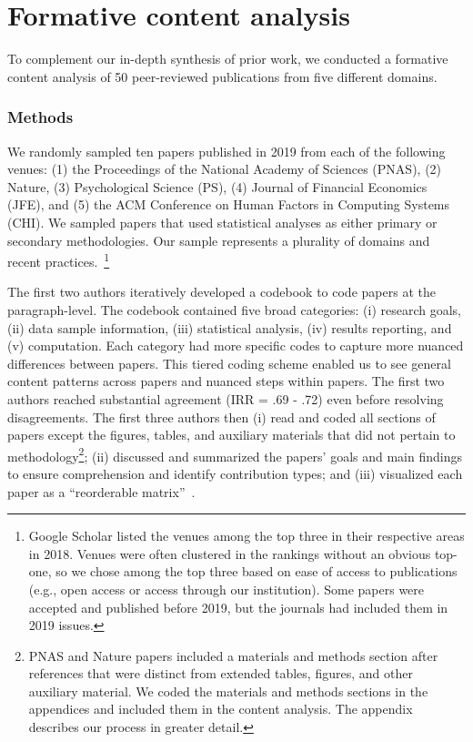 \section{Formative content analysis} \label{sec:contentAnalysisHypoForm} 
To complement our in-depth synthesis of prior work, we conducted a formative
content analysis of 50 peer-reviewed publications from five different domains. 

\subsubsection{Methods}
We randomly sampled ten papers published in 2019 from each of the following
venues: (1) the Proceedings of the National Academy of Sciences (PNAS), (2)
Nature, (3) Psychological Science (PS), (4) Journal of Financial Economics
(JFE), and (5) the ACM Conference on Human Factors in Computing Systems (CHI).
We sampled papers that used statistical analyses as either primary or secondary
methodologies. Our sample represents a plurality of domains and recent
practices.~\footnote{Google Scholar listed the venues among the top three in
their respective areas in 2018. Venues were often clustered in the rankings
without an obvious top-one, so we chose among the top three based on ease of
access to publications (e.g., open access or access through our institution).
Some papers were accepted and published before 2019, but the journals had
included them in 2019 issues.}


The first two authors iteratively developed a codebook to code papers at the
paragraph-level. The codebook contained five broad categories: (i) research
goals, (ii) data sample information, (iii) statistical analysis, (iv) results
reporting, and (v) computation. Each category had more specific codes to capture
more nuanced differences between papers. This tiered coding scheme enabled us to
see general content patterns across papers and nuanced steps within papers. The
first two authors reached substantial agreement (IRR = .69 - .72) even before
resolving disagreements. The first three authors then (i) read and coded all
sections of papers except the figures, tables, and auxiliary materials that did
not pertain to methodology\footnote{PNAS and Nature papers included a materials
and methods section after references that were distinct from extended tables,
figures, and other auxiliary material. We coded the materials and methods
sections in the appendices and included them in the content analysis. The appendix describes our process in greater detail.}; (ii) discussed
and summarized the papers' goals and main findings to ensure comprehension and
identify contribution types; and (iii) visualized each paper as a ``reorderable
matrix''~\cite{bertin2011graphics}. 


